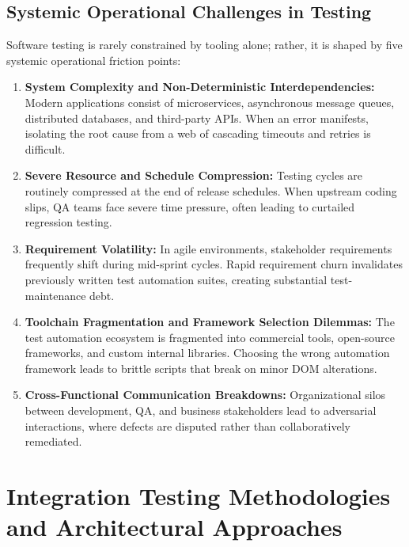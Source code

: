 \documentclass[11pt,a4paper]{article}
\begin{document}
\subsection{Systemic Operational Challenges in Testing}
Software testing is rarely constrained by tooling alone; rather, it is shaped by five systemic operational friction points:
\begin{enumerate}
    \item \textbf{System Complexity and Non-Deterministic Interdependencies:} Modern applications consist of microservices, asynchronous message queues, distributed databases, and third-party APIs. When an error manifests, isolating the root cause from a web of cascading timeouts and retries is difficult.
    \item \textbf{Severe Resource and Schedule Compression:} Testing cycles are routinely compressed at the end of release schedules. When upstream coding slips, QA teams face severe time pressure, often leading to curtailed regression testing.
    \item \textbf{Requirement Volatility:} In agile environments, stakeholder requirements frequently shift during mid-sprint cycles. Rapid requirement churn invalidates previously written test automation suites, creating substantial test-maintenance debt.
    \item \textbf{Toolchain Fragmentation and Framework Selection Dilemmas:} The test automation ecosystem is fragmented into commercial tools, open-source frameworks, and custom internal libraries. Choosing the wrong automation framework leads to brittle scripts that break on minor DOM alterations.
    \item \textbf{Cross-Functional Communication Breakdowns:} Organizational silos between development, QA, and business stakeholders lead to adversarial interactions, where defects are disputed rather than collaboratively remediated.
\end{enumerate}

\section[Integration Testing Methodologies]{Integration Testing Methodologies and Architectural Approaches}
\label{sec:integration_testing}
\end{document}
